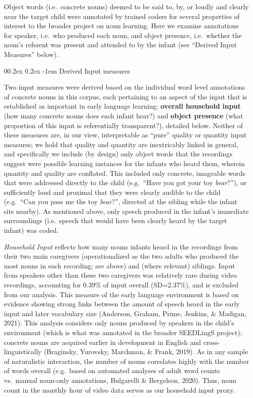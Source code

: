 \documentclass[
  man,mask,floatsintext]{apa6}
\makeatletter
\let\oldparagraph\paragraph
\renewcommand{\paragraph}[1]{\oldparagraph{#1}\mbox{}}
\renewcommand{\paragraph}{\@startsection{paragraph}{4}{\parindent}%
  {0\baselineskip \@plus 0.2ex \@minus 0.2ex}%
  {-1em}%
  {\normalfont\normalsize\bfseries\itshape\typesectitle}}
\makeatother
\begin{document}
Object words (i.e.~concrete nouns) deemed to be said to, by, or loudly and clearly near the target child were annotated by trained coders for several properties of interest to the broader project on noun learning. Here we examine annotations for speaker, i.e.~who produced each noun, and object presence, i.e.~whether the noun's referent was present and attended to by the infant (see ``Derived Input Measures'' below).

\hypertarget{derived-input-measures}{%
\paragraph{Derived Input measures}\label{derived-input-measures}}

Two input measures were derived based on the individual word level annotations of concrete nouns in this corpus, each pertaining to an aspect of the input that is established as important in early language learning: \textbf{overall household input} (how many concrete nouns does each infant hear?) and \textbf{object presence} (what proportion of this input is referentially transparent?), detailed below. Neither of these measures are, in our view, interpretable as ``pure'' quality or quantity input measures; we hold that quality and quantity are inextricably linked in general, and specifically we include (by design) only object words that the recordings suggest were possible learning instances for the infants who heard them, wherein quantity and quality are conflated. This included only concrete, imageable words that were addressed directly to the child (e.g.~``Have you got your toy \emph{bear}?''), or sufficiently loud and proximal that they were clearly audible to the child (e.g.~``Can you pass me the toy \emph{bear}?'', directed at the sibling while the infant sits nearby). As mentioned above, only speech produced in the infant's immediate surroundings (i.e.~speech that would have been clearly heard by the target infant) was coded.

\emph{Household Input} reflects how many nouns infants heard in the recordings from their two main caregivers (operationalized as the two adults who produced the most nouns in each recording; see above) and (where relevant) siblings. Input from speakers other than these two caregivers was relatively rare during video recordings, accounting for 0.39\% of input overall (SD=2.37\%), and is excluded from our analysis. This measure of the early language environment is based on evidence showing strong links between the amount of speech heard in the early input and later vocabulary size (Anderson, Graham, Prime, Jenkins, \& Madigan, 2021). This analysis considers only nouns produced by speakers in the child's environment (which is what was annotated in the broader SEEDLingS project); concrete nouns are acquired earlier in development in English and cross-linguistically (Braginsky, Yurovsky, Marchman, \& Frank, 2019). As in any sample of naturalistic interaction, the number of nouns correlates highly with the number of words overall (e.g.~based on automated analyses of adult word counts vs.~manual noun-only annotations, Bulgarelli \& Bergelson, 2020). Thus, noun count in the monthly hour of video data serves as our household input proxy.
\end{document}
